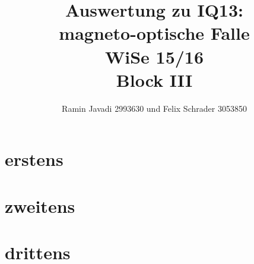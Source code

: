 \documentclass[12pt,a4paper]{article}
\title{Auswertung zu IQ13:\\
       magneto-optische Falle\\
       WiSe 15/16\\
       Block III}
\author{Ramin Javadi 2993630 und Felix Schrader 3053850}
\date{}
\begin{document}
\maketitle
\tableofcontents
\pagebreak
\section{erstens}
\section{zweitens}
\section{drittens}
\end{document}
